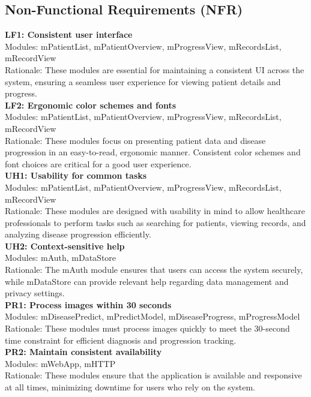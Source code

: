 \documentclass[12pt, titlepage]{article}
\begin{document}
\subsection{Non-Functional Requirements (NFR)}
\textbf{LF1: Consistent user interface} \\
Modules: mPatientList, mPatientOverview, mProgressView, mRecordsList, mRecordView \\
Rationale: These modules are essential for maintaining a consistent UI across the system, ensuring a seamless user experience for viewing patient details and progress. \\
\textbf{LF2: Ergonomic color schemes and fonts} \\
Modules: mPatientList, mPatientOverview, mProgressView, mRecordsList, mRecordView \\
Rationale: These modules focus on presenting patient data and disease progression in an easy-to-read, ergonomic manner. Consistent color schemes and font choices are critical for a good user experience. \\
\textbf{UH1: Usability for common tasks} \\
Modules: mPatientList, mPatientOverview, mProgressView, mRecordsList, mRecordView \\
Rationale: These modules are designed with usability in mind to allow healthcare professionals to perform tasks such as searching for patients, viewing records, and analyzing disease progression efficiently. \\
\textbf{UH2: Context-sensitive help} \\
Modules: mAuth, mDataStore \\
Rationale: The mAuth module ensures that users can access the system securely, while mDataStore can provide relevant help regarding data management and privacy settings. \\
\textbf{PR1: Process images within 30 seconds} \\
Modules: mDiseasePredict, mPredictModel, mDiseaseProgress, mProgressModel \\
Rationale: These modules must process images quickly to meet the 30-second time constraint for efficient diagnosis and progression tracking. \\
\textbf{PR2: Maintain consistent availability} \\
Modules: mWebApp, mHTTP \\
Rationale: These modules ensure that the application is available and responsive at all times, minimizing downtime for users who rely on the system. \\
\end{document}

